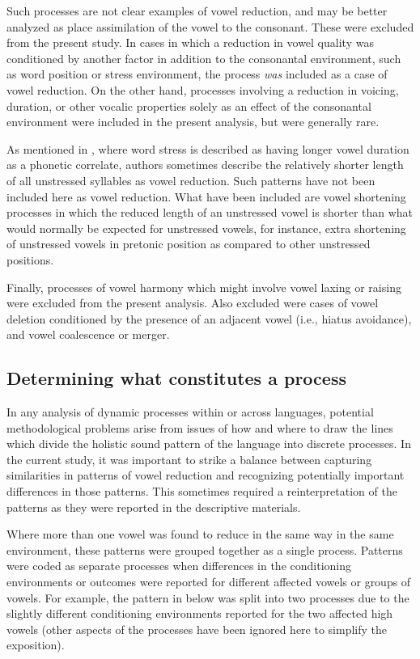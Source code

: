 Such processes are not clear examples of vowel reduction, and may be better analyzed as place assimilation of the vowel to the consonant. These were excluded from the present study. In cases in which a reduction in vowel quality was conditioned by another factor in addition to the consonantal environment, such as word position or stress environment, the process \textit{was} included as a case of vowel reduction. On the other hand, processes involving a reduction in voicing, duration, or other vocalic properties solely as an effect of the consonantal environment were included in the present analysis, but were generally rare.

  As mentioned in , where word stress is described as having longer vowel duration as a phonetic correlate, authors sometimes describe the relatively shorter length of all unstressed syllables as vowel reduction. Such patterns have not been included here as vowel reduction. What have been included are vowel shortening processes in which the reduced length of an unstressed vowel is shorter than what would normally be expected for unstressed vowels, for instance, extra shortening of unstressed vowels in pretonic position as compared to other unstressed positions.

  Finally, processes of vowel harmony which might involve vowel laxing or raising were excluded from the present analysis. Also excluded were cases of vowel deletion conditioned by the presence of an adjacent vowel (i.e., hiatus avoidance), and vowel coalescence or merger.

\subsection{Determining what constitutes a process}\label{sec:6.2.2}

  In any analysis of dynamic processes within or across languages, potential methodological problems arise from issues of how and where to draw the lines which divide the holistic sound pattern of the language into discrete processes. In the current study, it was important to strike a balance between capturing similarities in patterns of vowel reduction and recognizing potentially important differences in those patterns. This sometimes required a reinterpretation of the patterns as they were reported in the descriptive materials.

  Where more than one vowel was found to reduce in the same way in the same environment, these patterns were grouped together as a single process. Patterns were coded as separate processes when differences in the conditioning environments or outcomes were reported for different affected vowels or groups of vowels. For example, the pattern in  below was split into two processes due to the slightly different conditioning environments reported for the two affected high vowels (other aspects of the processes have been ignored here to simplify the exposition).

